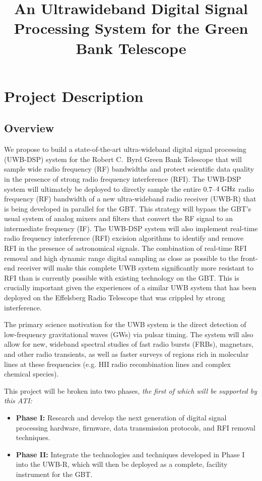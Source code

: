 \documentclass[10pt]{myNSF}
\begin{document}
\title{An Ultrawideband Digital Signal Processing System for the Green
  Bank Telescope}
\maketitle

\section{Project Description}
\label{sec:project_description}

\subsection{Overview}
\label{sec:overview}

We propose to build a state-of-the-art ultra-wideband digital signal
processing (UWB-DSP) system for the Robert C.\ Byrd Green Bank
Telescope that will sample wide radio frequency (RF) bandwidths and
protect scientific data quality in the presence of strong radio
frequency interference (RFI).  The UWB-DSP system will ultimately be
deployed to directly sample the entire $0.7$--$4\; \textrm{GHz}$ radio
frequency (RF) bandwidth of a new ultra-wideband radio receiver
(UWB-R) that is being developed in parallel for the GBT.  This
strategy will bypass the GBT's usual system of analog mixers and
filters that convert the RF signal to an intermediate frequency (IF).
The UWB-DSP system will also implement real-time radio frequency
interference (RFI) excision algorithms to identify and remove RFI in
the presence of astronomical signals.  The combination of real-time
RFI removal and high dynamic range digital sampling as close as
possible to the front-end receiver will make this complete UWB system
significantly more resistant to RFI than is currently possible with
existing technology on the GBT.  This is crucially important given the
experiences of a similar UWB system that has been deployed on the
Effelsberg Radio Telescope that was crippled by strong interference.

The primary science motivation for the UWB system is the direct
detection of low-frequency gravitational waves (GWs) via pulsar
timing.  The system will also allow for new, wideband spectral studies
of fast radio bursts (FRBs), magnetars, and other radio transients, as
well as faster surveys of regions rich in molecular lines at these
frequencies (e.g. H{\sc II} radio recombination lines and complex
chemical species).  

This project will be broken into two phases, \emph{the first of which
  will be supported by this ATI:}
\begin{itemize}
\item{\textbf{Phase {\sc I}:} Research and develop the next generation
    of digital signal processing hardware, firmware, data transmission
    protocols, and RFI removal techniques.}
\item{\textbf{Phase {\sc II}:} Integrate the technologies and
    techniques developed in Phase {\sc I} into the UWB-R, which will
    then be deployed as a complete, facility instrument for the GBT.}
\end{itemize}
\end{document}

